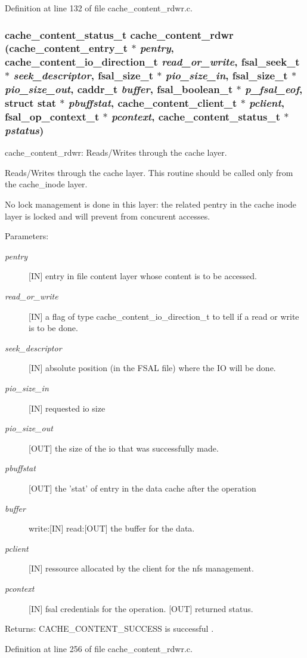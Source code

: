 Definition at line 132 of file cache\_\-content\_\-rdwr.c.
\subsubsection[{cache\_\-content\_\-rdwr}]{\setlength{\rightskip}{0pt plus 5cm}cache\_\-content\_\-status\_\-t cache\_\-content\_\-rdwr (cache\_\-content\_\-entry\_\-t $\ast$ {\em pentry}, \/  cache\_\-content\_\-io\_\-direction\_\-t {\em read\_\-or\_\-write}, \/  fsal\_\-seek\_\-t $\ast$ {\em seek\_\-descriptor}, \/  fsal\_\-size\_\-t $\ast$ {\em pio\_\-size\_\-in}, \/  fsal\_\-size\_\-t $\ast$ {\em pio\_\-size\_\-out}, \/  caddr\_\-t {\em buffer}, \/  fsal\_\-boolean\_\-t $\ast$ {\em p\_\-fsal\_\-eof}, \/  struct stat $\ast$ {\em pbuffstat}, \/  cache\_\-content\_\-client\_\-t $\ast$ {\em pclient}, \/  fsal\_\-op\_\-context\_\-t $\ast$ {\em pcontext}, \/  cache\_\-content\_\-status\_\-t $\ast$ {\em pstatus})}\label{cache__content__rdwr_8c_b32dc3e95e49d7cb59346969e6787bf3}


cache\_\-content\_\-rdwr: Reads/Writes through the cache layer.

Reads/Writes through the cache layer. This routine should be called only from the cache\_\-inode layer.

No lock management is done in this layer: the related pentry in the cache inode layer is locked and will prevent from concurent accesses.

\begin{Desc}
\item[Parameters:]
\begin{description}
\item[{\em pentry}][IN] entry in file content layer whose content is to be accessed. \item[{\em read\_\-or\_\-write}][IN] a flag of type cache\_\-content\_\-io\_\-direction\_\-t to tell if a read or write is to be done. \item[{\em seek\_\-descriptor}][IN] absolute position (in the FSAL file) where the IO will be done. \item[{\em pio\_\-size\_\-in}][IN] requested io size \item[{\em pio\_\-size\_\-out}][OUT] the size of the io that was successfully made. \item[{\em pbuffstat}][OUT] the 'stat' of entry in the data cache after the operation \item[{\em buffer}]write:[IN] read:[OUT] the buffer for the data. \item[{\em pclient}][IN] ressource allocated by the client for the nfs management. \item[{\em pcontext}][IN] fsal credentials for the operation.  [OUT] returned status.\end{description}
\end{Desc}
\begin{Desc}
\item[Returns:]CACHE\_\-CONTENT\_\-SUCCESS is successful . \end{Desc}


Definition at line 256 of file cache\_\-content\_\-rdwr.c.